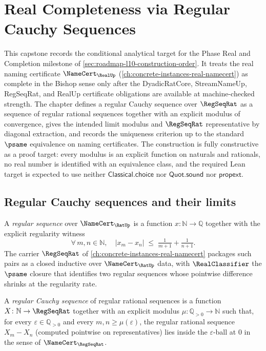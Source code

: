 \chapter{Real Completeness via Regular Cauchy Sequences}
\label{ch:visions-real-completeness}

This capstone records the conditional analytical target for the Phase Real and Completion milestone of \autoref{sec:roadmap-l10-construction-order}. It treats the real naming certificate $\NameCert_{\RealUp}$ (\autoref{ch:concrete-instances-real-namecert}) as complete in the Bishop sense only after the DyadicRatCore, StreamNameUp, RegSeqRat, and RealUp certificate obligations are available at machine-checked strength. The chapter defines a regular Cauchy sequence over $\RegSeqRat$ as a sequence of regular rational sequences together with an explicit modulus of convergence, gives the intended limit modulus and $\RegSeqRat$ representative by diagonal extraction, and records the uniqueness criterion up to the standard $\psame$ equivalence on naming certificates. The construction is fully constructive as a proof target: every modulus is an explicit function on naturals and rationals, no real number is identified with an equivalence class, and the required Lean target is expected to use neither $\mathsf{Classical.choice}$ nor $\mathsf{Quot.sound}$ nor $\mathsf{propext}$.

\section{Regular Cauchy sequences and their limits}
\label{sec:real-completeness-regular-cauchy}

\begin{definition}
\label{def:real-completeness-regular-rat-sequence}
A \emph{regular sequence} over $\NameCert_{\RatUp}$ is a function $x \colon \mathbb{N} \to \mathbb{Q}$ together with the explicit regularity witness
$$ \forall\, m, n \in \mathbb{N}, \quad |x_m - x_n| \;\le\; \tfrac{1}{m+1} + \tfrac{1}{n+1}. $$
The carrier $\RegSeqRat$ of \autoref{ch:concrete-instances-real-namecert} packages such pairs as a closed inductive over $\NameCert_{\RatUp}$ data, with $\RealClassifier$ the $\psame$ closure that identifies two regular sequences whose pointwise difference shrinks at the regularity rate.
\end{definition}

\begin{definition}
\label{def:real-completeness-regular-cauchy-rat}
A \emph{regular Cauchy sequence} of regular rational sequences is a function $X \colon \mathbb{N} \to \RegSeqRat$ together with an explicit modulus $\mu \colon \mathbb{Q}_{>0} \to \mathbb{N}$ such that, for every $\varepsilon \in \mathbb{Q}_{>0}$ and every $m, n \ge \mu(\varepsilon)$, the regular rational sequence $X_m - X_n$ (computed pointwise on representatives) lies inside the $\varepsilon$-ball at $0$ in the sense of $\NameCert_{\RegSeqRat}$.
\end{definition}

